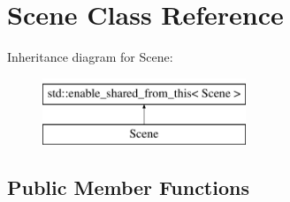 \hypertarget{class_scene}{}\section{Scene Class Reference}
\label{class_scene}
Inheritance diagram for Scene\+:\begin{figure}[H]
\begin{center}
\leavevmode
\includegraphics[height=2.000000cm]{class_scene}
\end{center}
\end{figure}
\subsection*{Public Member Functions}
